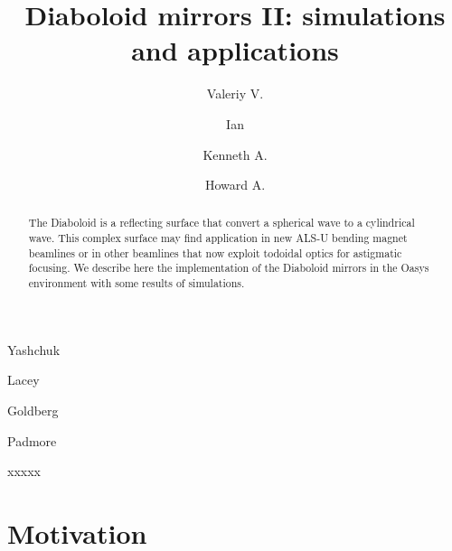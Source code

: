 \documentclass{iucr}              %
\begin{document}




\title{Diaboloid mirrors II: simulations and applications}

\author[a]{Valeriy V.}{Yashchuk}
\author[a]{Ian}{Lacey}
\author[a]{Kenneth A.}{Goldberg}
\author[a]{Howard A.}{Padmore}




\begin{synopsis}
xxxxx
\end{synopsis}

\begin{abstract}
The Diaboloid is a reflecting surface that convert a spherical wave to a cylindrical wave. This complex surface may find application in new ALS-U bending magnet beamlines or in other  beamlines that now exploit todoidal optics for astigmatic focusing. We describe here the implementation of the Diaboloid mirrors in the Oasys environment with some results of  simulations. 
\end{abstract}

\section{Motivation}

\end{document}
